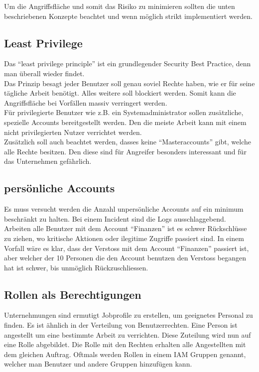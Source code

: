 Um die Angriffsfläche und somit das Risiko zu minimieren sollten die unten beschriebenen Konzepte beachtet und wenn möglich strikt implementiert werden.

\subsection{Least Privilege}
Das ``least privilege principle'' ist ein grundlegender Security Best Practice, denn man überall wieder findet.\\

Das Prinzip besagt jeder Benutzer soll genau soviel Rechte haben, wie er für seine tägliche Arbeit benötigt. Alles weitere soll blockiert werden.
Somit kann die Angriffsfläche bei Vorfällen massiv verringert werden.\\

Für privilegierte Benutzer wie z.B. ein Systemadministrator sollen zusätzliche, spezielle Accounts bereitgestellt werden.
Den die meiste Arbeit kann mit einem nicht privilegierten Nutzer verrichtet werden.\\

Zusätzlich soll auch beachtet werden, dasses keine ``Masteraccounts'' gibt, welche alle Rechte besitzen.
Den diese sind für Angreifer besonders interessant und für das Unternehmen gefährlich.


\subsection{persönliche Accounts}
Es muss versucht werden die Anzahl unpersönliche Accounts auf ein minimum beschränkt zu halten.
Bei einem Incident sind die Logs ausschlaggebend.\\

Arbeiten alle Benutzer mit dem Account ``Finanzen'' ist es schwer Rückschlüsse zu ziehen, wo kritische Aktionen oder ilegitime Zugriffe passiert sind.
In einem Vorfall wäre es klar, dass der Verstoss mit dem Account ``Finanzen'' passiert ist, aber welcher der 10 Personen die den Account benutzen den Verstoss begangen hat ist schwer, bis unmöglich Rückzuschliessen.

\subsection{Rollen als Berechtigungen}
Unternehmungen sind ermutigt Jobprofile zu erstellen, um geeignetes Personal zu finden.
Es ist ähnlich in der Verteilung von Benutzerrechten.
Eine Person ist angestellt um eine bestimmte Arbeit zu verrichten.
Diese Zuteilung wird nun auf eine Rolle abgebildet.
Die Rolle mit den Rechten erhalten alle Angestellten mit dem gleichen Auftrag.
Oftmals werden Rollen in einem IAM Gruppen genannt, welcher man Benutzer und andere Gruppen hinzufügen kann.\\

